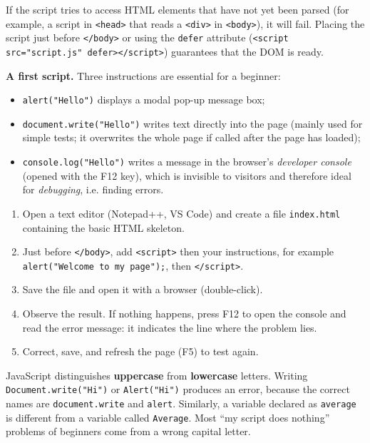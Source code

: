 \documentclass[11pt]{article}
\begin{document}
\begin{attention}
If the script tries to access HTML elements that have not yet been parsed (for example, a script in \texttt{<head>} that reads a \texttt{<div>} in \texttt{<body>}), it will fail. Placing the script just before \texttt{</body>} or using the \texttt{defer} attribute (\texttt{<script src="script.js" defer></script>}) guarantees that the DOM is ready.
\end{attention}

\textbf{A first script.} Three instructions are essential for a beginner:
\begin{itemize}
\item \texttt{alert("Hello")} displays a modal pop-up message box;
\item \texttt{document.write("Hello")} writes text directly into the page (mainly used for simple tests; it overwrites the whole page if called after the page has loaded);
\item \texttt{console.log("Hello")} writes a message in the browser's \emph{developer console} (opened with the F12 key), which is invisible to visitors and therefore ideal for \emph{debugging}, i.e. finding errors.
\end{itemize}

\begin{methode}
\begin{enumerate}
\item Open a text editor (Notepad++, VS Code) and create a file \texttt{index.html} containing the basic HTML skeleton.
\item Just before \texttt{</body>}, add \texttt{<script>} then your instructions, for example \texttt{alert("Welcome to my page");}, then \texttt{</script>}.
\item Save the file and open it with a browser (double-click).
\item Observe the result. If nothing happens, press F12 to open the console and read the error message: it indicates the line where the problem lies.
\item Correct, save, and refresh the page (F5) to test again.
\end{enumerate}
\end{methode}

\begin{attention}
JavaScript distinguishes \textbf{uppercase} from \textbf{lowercase} letters. Writing \texttt{Document.write("Hi")} or \texttt{Alert("Hi")} produces an error, because the correct names are \texttt{document.write} and \texttt{alert}. Similarly, a variable declared as \texttt{average} is different from a variable called \texttt{Average}. Most ``my script does nothing'' problems of beginners come from a wrong capital letter.
\end{attention}
\end{document}
